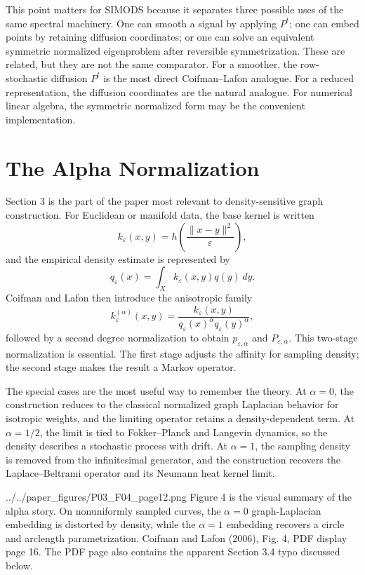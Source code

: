 \documentclass[11pt]{article}
\begin{document}
This point matters for SIMODS because it separates three possible uses of the
same spectral machinery.  One can smooth a signal by applying $P^t$; one can
embed points by retaining diffusion coordinates; or one can solve an
equivalent symmetric normalized eigenproblem after reversible symmetrization.
These are related, but they are not the same comparator.  For a smoother, the
row-stochastic diffusion $P^t$ is the most direct Coifman--Lafon analogue.
For a reduced representation, the diffusion coordinates are the natural
analogue.  For numerical linear algebra, the symmetric normalized form may be
the convenient implementation.

\section{The Alpha Normalization}

Section 3 is the part of the paper most relevant to density-sensitive graph
construction.  For Euclidean or manifold data, the base kernel is written
\[
  k_\varepsilon(x,y)
  =
  h\left(\frac{\|x-y\|^2}{\varepsilon}\right),
\]
and the empirical density estimate is represented by
\[
  q_\varepsilon(x)
  =
  \int_X k_\varepsilon(x,y)q(y)\,dy.
\]
Coifman and Lafon then introduce the anisotropic family
\[
  k_\varepsilon^{(\alpha)}(x,y)
  =
  \frac{k_\varepsilon(x,y)}
       {q_\varepsilon(x)^\alpha q_\varepsilon(y)^\alpha},
\]
followed by a second degree normalization to obtain
$p_{\varepsilon,\alpha}$ and $P_{\varepsilon,\alpha}$.  This two-stage
normalization is essential.  The first stage adjusts the affinity for sampling
density; the second stage makes the result a Markov operator.

The special cases are the most useful way to remember the theory.  At
$\alpha=0$, the construction reduces to the classical normalized graph
Laplacian behavior for isotropic weights, and the limiting operator retains a
density-dependent term.  At $\alpha=1/2$, the limit is tied to
Fokker--Planck and Langevin dynamics, so the density describes a stochastic
process with drift.  At $\alpha=1$, the sampling density is removed from the
infinitesimal generator, and the construction recovers the
Laplace--Beltrami operator and its Neumann heat kernel limit.

\paperfigure
  {../../paper_figures/P03_F04_page12.png}
  {Figure 4 is the visual summary of the alpha story.  On nonuniformly sampled
  curves, the $\alpha=0$ graph-Laplacian embedding is distorted by density,
  while the $\alpha=1$ embedding recovers a circle and arclength
  parametrization.}
  {Coifman and Lafon (2006), Fig. 4, PDF display page 16.}
  {The PDF page also contains the apparent Section 3.4 typo discussed below.}
\end{document}
